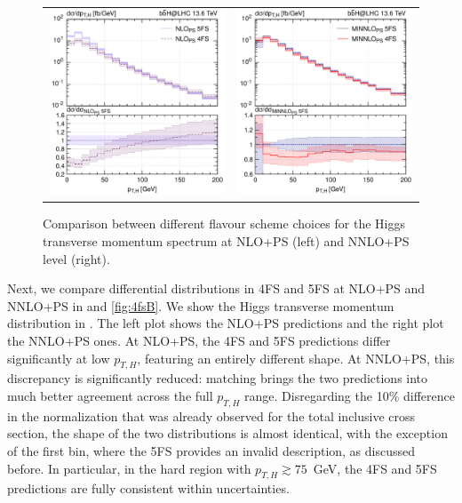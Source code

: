 \documentclass[11pt,a4paper]{article}
\begin{document}
\begin{figure}[t!]
\begin{center}
\begin{tabular}{cc}
\includegraphics[width=.45\textwidth, page=1]{plots/4fs/pt_Higgs_NLO_5FS_4FS.pdf}&
\includegraphics[width=.45\textwidth, page=1]{plots/4fs/pt_Higgs_minnlops_5FS_4FS-FC.pdf}
\end{tabular}
\vspace*{1ex}
\caption{Comparison between different flavour scheme choices for the Higgs transverse momentum spectrum at NLO+PS (left) and NNLO+PS level (right). \label{fig:4fsA}}
\end{center}
\end{figure}

Next, we compare differential distributions in 4FS and 5FS at NLO+PS and NNLO+PS in  and \ref{fig:4fsB}. 
We show the Higgs transverse momentum distribution in . The left plot shows the NLO+PS predictions and the right plot the NNLO+PS ones. 
At NLO+PS, the 4FS and 5FS predictions differ significantly at low $p_{T,H}$, featuring an entirely different shape. 
At NNLO+PS, this discrepancy is significantly reduced: \minnlo{} matching brings the two predictions into much better 
agreement across the full $p_{T,H}$ range. Disregarding the 10\% difference in the normalization that was already observed for 
the total inclusive cross section, the shape of the two distributions is almost identical, with the exception of the first bin,
where the 5FS provides an invalid description, as discussed before.
In particular, in the hard region with $p_{T,H} \gtrsim 75$~GeV, the 4FS and 5FS predictions are fully consistent within uncertainties.
\end{document}
